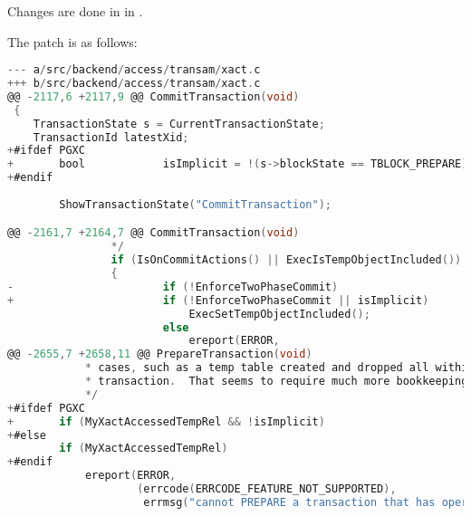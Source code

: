   Changes are done in  in .
  
  The patch is as follows:

  \lstset{tabsize=4, xleftmargin=20pt, basicstyle=\ttfamily\scriptsize, breaklines=true}
  \begin{lstlisting}[frame=single, tabsize=4, language=C]
--- a/src/backend/access/transam/xact.c
+++ b/src/backend/access/transam/xact.c
@@ -2117,6 +2117,9 @@ CommitTransaction(void)
 {
	TransactionState s = CurrentTransactionState;
	TransactionId latestXid;
+#ifdef PGXC
+       bool            isImplicit = !(s->blockState == TBLOCK_PREPARE);
+#endif
							  
		ShowTransactionState("CommitTransaction");

@@ -2161,7 +2164,7 @@ CommitTransaction(void)
				*/
				if (IsOnCommitActions() || ExecIsTempObjectIncluded())
				{
-                       if (!EnforceTwoPhaseCommit)
+                       if (!EnforceTwoPhaseCommit || isImplicit)
							ExecSetTempObjectIncluded();
						else
							ereport(ERROR,
@@ -2655,7 +2658,11 @@ PrepareTransaction(void)
			* cases, such as a temp table created and dropped all within the
			* transaction.  That seems to require much more bookkeeping though.
			*/
+#ifdef PGXC
+       if (MyXactAccessedTempRel && !isImplicit)
+#else
		if (MyXactAccessedTempRel)
+#endif
			ereport(ERROR,
					(errcode(ERRCODE_FEATURE_NOT_SUPPORTED),
					 errmsg("cannot PREPARE a transaction that has operated on temporary tables")));
  \end{lstlisting}
